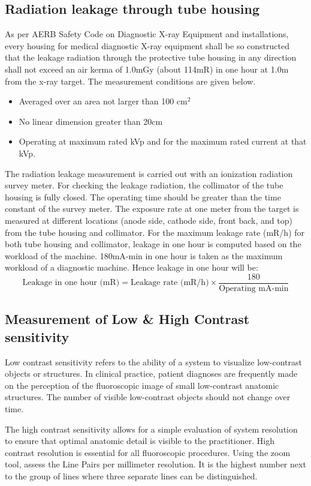 \subsection{Radiation leakage through tube housing}
As per AERB Safety Code on Diagnostic X-ray Equipment and installations, every housing for
medical diagnostic X-ray equipment shall be so constructed that the leakage radiation through the
protective tube housing in any direction shall not exceed an air kerma of 1.0mGy (about 114mR) in
one hour at 1.0m from the x-ray target. The measurement conditions are given below.
\begin{itemize}
    \item Averaged over an area not larger than 100 cm$^2$
    \item No linear dimension greater than 20cm
    \item Operating at maximum rated kVp and for the maximum rated current at that kVp.
\end{itemize}

The radiation leakage measurement is carried out with an ionization radiation survey meter. For checking the leakage radiation, the collimator of the tube housing is fully closed. The operating time should be greater than the time constant of the survey meter. The exposure rate at one meter from the target is measured at different locations (anode side, cathode side, front back, and top) from the tube housing and collimator. For the maximum leakage rate (mR/h) for both tube housing and collimator, leakage in one hour is computed based on the workload of the machine. 180mA-min in one hour is taken as the maximum workload of a diagnostic machine.
Hence leakage in one hour will be:
\[\text{Leakage in one hour (mR)} = \text{Leakage rate (mR/h)} \times \frac{180}{\text{Operating mA-min}}\]
\subsection{Measurement of Low \& High Contrast sensitivity}
Low contrast sensitivity refers to the ability of a system to visualize low-contrast objects or structures. In clinical practice, patient diagnoses are frequently made on the perception of the fluoroscopic image of small low-contrast anatomic structures. The number of visible low-contrast objects should not change over time.

The high contrast sensitivity allows for a simple evaluation of system resolution to ensure that optimal anatomic detail is visible to the practitioner. High contrast resolution is essential for all fluoroscopic procedures. Using the zoom tool, assess the Line Pairs per millimeter resolution. It is the highest number next to the group of lines where three separate lines can be distinguished.

